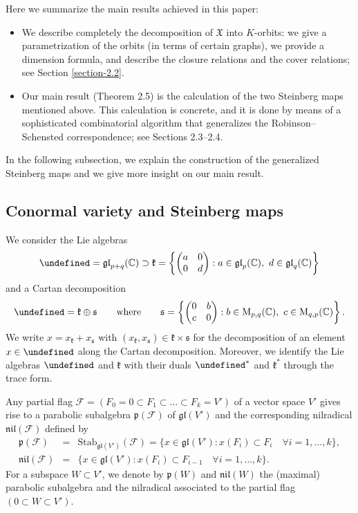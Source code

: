 \documentclass[11pt]{article}
\providecommand{\fg}{\nobreakspace»}
\theoremstyle{definition}
\numberwithin{equation}{section}
\let\fg\undefined
\newcommand{\fk}{\mathfrak{k}}
\newcommand{\fs}{\mathfrak{s}}
\newcommand{\fg}{\mathfrak{g}}
\newcommand{\fp}{\mathfrak{p}}
\newcommand{\gl}{\mathfrak{gl}}
\newcommand{\nil}{\mathfrak{nil}}
\newcommand{\Mat}{\mathrm{M}}
\newcommand{\flag}{\mathcal{F}}
\newcommand{\Xfv}{\mathfrak{X}}
\newcommand{\mC}{\mathbb{C}}
\begin{document}
Here we summarize the main results achieved in this paper:
\begin{itemize}
\item We describe completely the decomposition of $\Xfv$ into $K$-orbits: we give a para\-metrization of the orbits (in terms of certain graphs), we provide a dimension formula, and describe the closure relations and the cover relations; see Section \ref{section-2.2}.
\item Our main result (Theorem 2.5) is the calculation of the two Steinberg maps mentioned above. This calculation is concrete, and it is done by means of a sophisticated combinatorial algorithm that generalizes the Robinson--Schensted correspondence; see Sections 2.3--2.4.
\end{itemize}
In the following subsection, we explain the construction of the generalized Steinberg maps and we give more insight on our main result.

\subsection{Conormal variety and Steinberg maps}
\label{section-1.2}
We consider the Lie algebras
\[
\fg=\gl_{p+q}(\mC)\supset\fk=\left\{\begin{pmatrix} a & 0\\ 0 & d \end{pmatrix}:a\in\gl_p(\mC),\ d\in\gl_q(\mC)\right\}
\]
and a Cartan decomposition
\[
\fg=\fk\oplus\fs\qquad\mbox{where}\qquad\fs=\left\{\begin{pmatrix} 0 & b\\ c & 0 \end{pmatrix}:b\in\Mat_{p,q}(\mC),\ c\in\Mat_{q,p}(\mC)\right\}.
\]
We write $x=x_\fk+x_\fs$ with $(x_\fk,x_\fs)\in\fk\times\fs$ for the decomposition of an element $x\in\fg$ along the Cartan decomposition.
Moreover, we identify the Lie algebras $\fg$ and $\fk$ with their duals $\fg^*$ and $\fk^*$ through the trace form.

Any partial flag $\flag=(F_0=0\subset F_1\subset\ldots\subset F_k=V')$ of a vector space $V'$ gives rise to a parabolic subalgebra $\fp(\flag)$ of $\gl(V')$ and the corresponding nilradical $\nil(\flag)$ defined by
\begin{eqnarray*}
\fp(\flag) & = & \mathrm{Stab}_{\gl(V')}(\flag)=\{x\in\gl(V'):x(F_i)\subset F_i\quad \forall i=1,\ldots,k\},\\
\nil(\flag) & = & \{x\in\gl(V'):x(F_i)\subset F_{i-1}\quad\forall i=1,\ldots,k\}.
\end{eqnarray*}
For a subspace $W\subset V'$, we denote by $\fp(W)$ and $\nil(W)$ the (maximal) parabolic subalgebra and the nilradical associated to the partial flag $(0\subset W\subset V')$.
\end{document}
